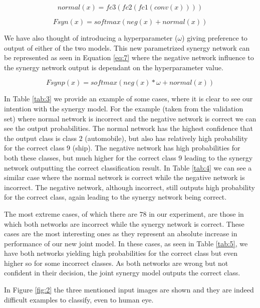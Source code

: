 \documentclass[b5paper]{book}
\begin{document}
\begin{equation}\label{eq:5}
normal(x) = fc3(fc2(fc1(conv(x))))
\end{equation}

\begin{equation}\label{eq:6}
Fsyn(x) = softmax(neg(x) + normal(x))
\end{equation}

We have also thought of introducing a hyperparameter (\(\omega\)) giving preference to output of either of the two models. This new parametrized synergy network can be represented as seen in Equation \ref{eq:7} where the negative network influence to the synergy network output is dependant on the hyperparameter value.

\begin{equation}\label{eq:7}
Fsynp(x) = softmax(neg(x) * \omega + normal(x))
\end{equation}

In Table \ref{tab:3} we provide an example of some cases, where it is clear to see our intention with the synergy model. For the example (taken from the validation set) where normal network is incorrect and the negative network is correct we can see the output probabilities. The normal network has the highest confidence that the output class is class \(2\) (automobile), but also has relatively high probability for the correct class \(9\) (ship). The negative network has high probabilities for both these classes, but much higher for the correct class \(9\) leading to the synergy network outputting the correct classification result. In Table \ref{tab:4} we can see a similar case where the normal network is correct while the negative network is incorrect. The negative network, although incorrect, still outputs high probability for the correct class, again leading to the synergy network being correct.

The most extreme cases, of which there are \( 78 \) in our experiment, are those in which both networks are incorrect while the synergy network is correct. These cases are the most interesting ones as they represent an absolute increase in performance of our new joint model. In these cases, as seen in Table \ref{tab:5}, we have both networks yielding high probabilities for the correct class but even higher so for some incorrect classes. As both networks are wrong but not confident in their decision, the joint synergy model outputs the correct class.

In Figure \ref{fig:2} the three mentioned input images are shown and they are indeed difficult examples to classify, even to human eye.
\end{document}
